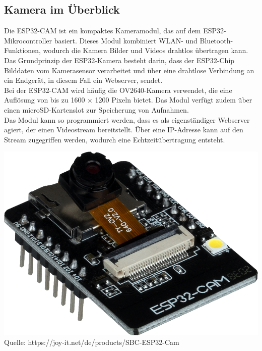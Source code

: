 \documentclass[ngerman,12pt,a4paper]{article}
\begin{document}
		\subsection{Kamera im Überblick} %
		Die ESP32-CAM ist ein kompaktes Kameramodul, das auf dem ESP32-Mikrocontroller basiert. Dieses Modul kombiniert WLAN- und Bluetooth-Funktionen, wodurch die Kamera Bilder und Videos drahtlos übertragen kann. Das Grundprinzip der ESP32-Kamera besteht darin, dass der ESP32-Chip Bilddaten vom Kamerasensor verarbeitet und über eine drahtlose Verbindung an ein Endgerät, in diesem Fall ein Webserver, sendet. \\[0.5cm]
		Bei der ESP32-CAM wird häufig die OV2640-Kamera verwendet, die eine Auflösung von bis zu 1600 × 1200 Pixeln bietet. Das Modul verfügt zudem über einen microSD-Kartenslot zur Speicherung von Aufnahmen.\\[0.5cm]
		Das Modul kann so programmiert werden, dass es als eigenständiger Webserver agiert, der einen Videostream bereitstellt. Über eine IP-Adresse kann auf den Stream zugegriffen werden, wodurch eine Echtzeitübertragung entsteht. 
		\begin{center}
			\begin{minipage}{0.9\textwidth}
				\centering
				\includegraphics[width=\textwidth]{Pictures/esp32_cam}
				\label{fig:esp32_cam}
				\vspace{5pt}
				{\small Quelle: {https://joy-it.net/de/products/SBC-ESP32-Cam}}
			\end{minipage}
		\end{center}
		\newpage \noindent
\end{document}
